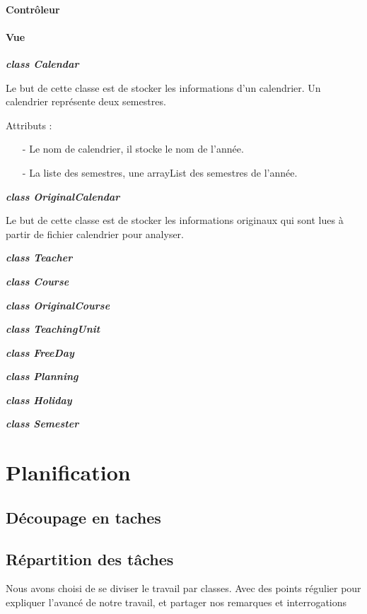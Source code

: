 \documentclass{polytech/polytech}
\begin{document}
	\subsubsection{Contrôleur}

	\subsubsection{Vue}
	\textbf{\textit{class Calendar}}

	Le but de cette classe est de stocker les informations d'un calendrier. Un calendrier représente deux semestres.

	Attributs :
	\begin{itemize}
		\item[-] Le nom de calendrier, il stocke le nom de l'année.
		\item[-] La liste des semestres, une arrayList des semestres de l'année.
	\end{itemize}

	\textbf{\textit{class OriginalCalendar}}

	Le but de cette classe est de stocker les informations originaux qui sont lues à partir de fichier calendrier pour analyser. 

	\textbf{\textit{class Teacher}}

	\textbf{\textit{class Course}}

	\textbf{\textit{class OriginalCourse}}

	\textbf{\textit{class TeachingUnit}}

	\textbf{\textit{class FreeDay}}

	\textbf{\textit{class Planning}}

	\textbf{\textit{class Holiday}}

	\textbf{\textit{class Semester}}

	\chapter{Planification}

	\section{Découpage en taches}

	\section{Répartition des tâches}

	Nous avons choisi de se diviser le travail par classes.
	Avec des points régulier pour expliquer l'avancé de notre travail, et partager nos remarques et
	interrogations
\end{document}
